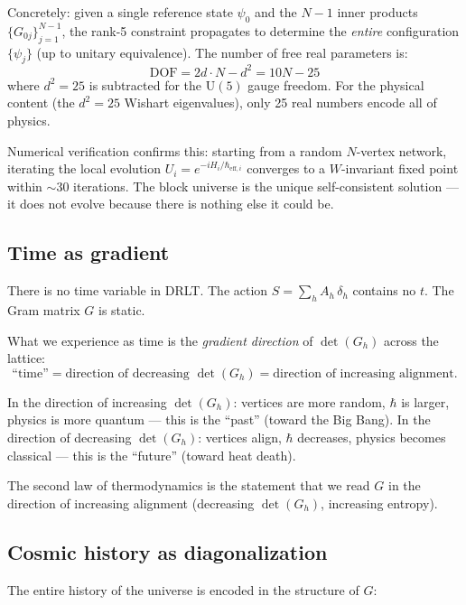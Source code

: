 \documentclass[12pt]{article}
\theoremstyle{remark}
\theoremstyle{definition}
\begin{document}
Concretely: given a single reference state $\psi_0$ and the $N - 1$ inner products $\{G_{0j}\}_{j=1}^{N-1}$, the rank-5 constraint propagates to determine the \emph{entire} configuration $\{\psi_j\}$ (up to unitary equivalence). The number of free real parameters is:
\begin{equation}
\text{DOF} = 2d \cdot N - d^2 = 10N - 25
\end{equation}
where $d^2 = 25$ is subtracted for the $\text{U}(5)$ gauge freedom. For the physical content (the $d^2 = 25$ Wishart eigenvalues), only 25 real numbers encode all of physics.

Numerical verification confirms this: starting from a random $N$-vertex network, iterating the local evolution $U_i = e^{-iH_i/\hbar_{\text{eff},i}}$ converges to a $W$-invariant fixed point within $\sim 30$ iterations. The block universe is the unique self-consistent solution --- it does not evolve because there is nothing else it could be.

\subsection{Time as gradient}

There is no time variable in DRLT. The action $S = \sum_h A_h\,\delta_h$ contains no $t$. The Gram matrix $G$ is static.

What we experience as time is the \emph{gradient direction} of $\det(G_h)$ across the lattice:
\begin{equation}
\text{``time''} = \text{direction of decreasing } \det(G_h) = \text{direction of increasing alignment}.
\end{equation}

In the direction of increasing $\det(G_h)$: vertices are more random, $\hbar$ is larger, physics is more quantum --- this is the ``past'' (toward the Big Bang). In the direction of decreasing $\det(G_h)$: vertices align, $\hbar$ decreases, physics becomes classical --- this is the ``future'' (toward heat death).

The second law of thermodynamics is the statement that we read $G$ in the direction of increasing alignment (decreasing $\det(G_h)$, increasing entropy).

\subsection{Cosmic history as diagonalization}

The entire history of the universe is encoded in the structure of $G$:
\end{document}
